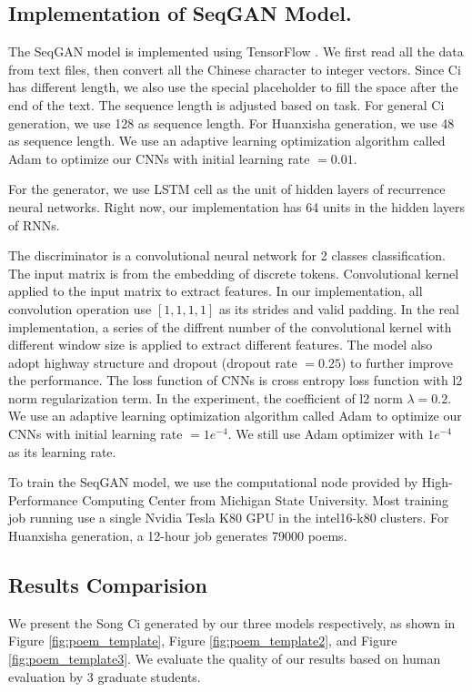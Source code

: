 \subsection{Implementation of SeqGAN Model.} 

The SeqGAN model is implemented using TensorFlow \cite{tensorflow}. We first read all the data from text files, then convert all the Chinese character to integer vectors. Since Ci has different length, we also use the special placeholder to fill the space after the end of the text. The sequence length is adjusted based on task. For general Ci generation, we use 128 as sequence length. For Huanxisha generation, we use 48 as sequence length. We use an adaptive learning optimization algorithm called Adam \cite{kingma2014adam} to optimize our CNNs with initial learning rate $ =  0.01 $.

For the generator, we use LSTM cell \cite{hochreiter1997lstm} as the unit of hidden layers of recurrence neural networks. Right now, our implementation has 64 units in the hidden layers of RNNs.

The discriminator is a convolutional neural network for 2 classes classification. The input matrix is from the embedding of discrete tokens. Convolutional kernel applied to the input matrix to extract features. In our implementation, all convolution operation use $ [1, 1, 1, 1]  $ as its strides and valid padding. In the real implementation, a series of the diffrent number of the convolutional kernel with different window size is applied to extract different features. The model also adopt highway structure \cite{srivastava2015highway} and dropout (dropout rate $ = 0.25 $)\cite{hinton2012dropout} to further improve the performance. The loss function of CNNs is cross entropy loss function with l2 norm regularization term. In the experiment, the coefficient of l2 norm $ \lambda =  0.2 $. We use an adaptive learning optimization algorithm called Adam \cite{kingma2014adam} to optimize our CNNs with initial learning rate $ =  1e^{-4} $. We still use Adam optimizer with $ 1e^{-4} $ as its learning rate.

To train the SeqGAN model, we use the computational node provided by High-Performance Computing Center from Michigan State University. Most training job running use a single Nvidia Tesla K80 GPU in the  intel16-k80 clusters. For Huanxisha generation, a 12-hour job generates 79000 poems.
 

 

\subsection {Results Comparision}
We present  the Song Ci generated by our three models respectively, as shown in Figure \ref{fig:poem_template}, Figure \ref{fig:poem_template2}, and Figure \ref{fig:poem_template3}. We evaluate the quality of our results based on human evaluation by 3 graduate students.

